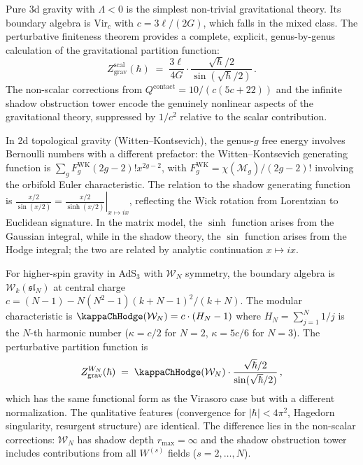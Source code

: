 \begin{remark}
Pure 3d gravity with $\Lambda < 0$ is the simplest non-trivial gravitational theory. Its boundary algebra is $\mathrm{Vir}_c$ with $c = 3\ell/(2G)$, which falls in the mixed class. The perturbative finiteness theorem provides a complete, explicit, genus-by-genus calculation of the gravitational partition function:
\[
Z_{\mathrm{grav}}^{\mathrm{scal}}(\hbar) \;=\; \frac{3\ell}{4G} \cdot \frac{\sqrt{\hbar}/2}{\sin(\sqrt{\hbar}/2)}\,.
\]
The non-scalar corrections from $Q^{\mathrm{contact}} = 10/(c(5c+22))$ and the infinite shadow obstruction tower encode the genuinely nonlinear aspects of the gravitational theory, suppressed by $1/c^2$ relative to the scalar contribution.
\end{remark}

\begin{remark}
In 2d topological gravity (Witten--Kontsevich), the genus-$g$ free energy involves Bernoulli numbers with a different prefactor: the Witten--Kontsevich generating function is $\sum_g F_g^{\mathrm{WK}} (2g-2)! x^{2g-2}$, with $F_g^{\mathrm{WK}} = \chi(\mathcal{M}_g) / (2g-2)!$ involving the orbifold Euler characteristic. The relation to the shadow generating function is $\frac{x/2}{\sin(x/2)} = \left.\frac{x/2}{\sinh(x/2)}\right|_{x \mapsto ix}$, reflecting the Wick rotation from Lorentzian to Euclidean signature. In the matrix model, the $\sinh$ function arises from the Gaussian integral, while in the shadow theory, the $\sin$ function arises from the Hodge integral; the two are related by analytic continuation $x \mapsto ix$.
\end{remark}

\begin{remark}
For higher-spin gravity in AdS$_3$ with $\mathcal{W}_N$ symmetry, the boundary algebra is $\mathcal{W}_k(\mathfrak{sl}_N)$ at central charge $c = (N-1) - N(N^2-1)(k+N-1)^2/(k+N)$. The modular characteristic is $\kappaChHodge(\mathcal{W}_N) = c \cdot (H_N - 1)$ where $H_N = \sum_{j=1}^N 1/j$ is the $N$-th harmonic number ($\kappa = c/2$ for $N=2$, $\kappa = 5c/6$ for $N=3$). The perturbative partition function is
\[
Z_{\mathrm{grav}}^{W_N}(\hbar) \;=\; \kappaChHodge(\mathcal{W}_N) \cdot \frac{\sqrt{\hbar}/2}{\sin(\sqrt{\hbar}/2)}\,,
\]
which has the same functional form as the Virasoro case but with a different normalization. The qualitative features (convergence for $|\hbar| < 4\pi^2$, Hagedorn singularity, resurgent structure) are identical. The difference lies in the non-scalar corrections: $\mathcal{W}_N$ has shadow depth $r_{\max} = \infty$ and the shadow obstruction tower includes contributions from all $W^{(s)}$ fields ($s = 2, \ldots, N$).
\end{remark}

